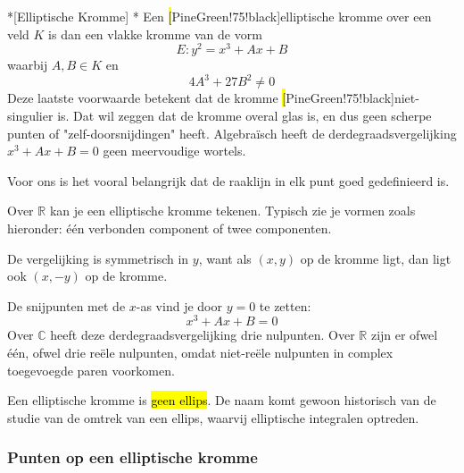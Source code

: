 \begin{nicedefinition}*[Elliptische Kromme]
    \nextpart[]*
    Een \hl[PineGreen!75!black]{elliptische kromme} over een veld $K$ is dan een vlakke kromme van de vorm
    \begin{equation*}
        E : y^2 = x^3 + Ax + B
    \end{equation*}
    waarbij $A, B \in K$ en
    \begin{equation*}
        4A^3 + 27B^2 \neq 0
    \end{equation*}
    Deze laatste voorwaarde betekent dat de kromme \hl[PineGreen!75!black]{niet-singulier} is. Dat wil zeggen dat de kromme overal glas is, en dus geen scherpe punten of "zelf-doorsnijdingen" heeft. Algebraïsch heeft de derdegraadsvergelijking $x^3 + Ax + B = 0$ geen meervoudige wortels.

    \vspace{0.20cm}

    Voor ons is het vooral belangrijk dat de raaklijn in elk punt goed gedefinieerd is.
\end{nicedefinition}

\newpage
{}

Over $\mathbb{R}$ kan je een elliptische kromme tekenen. Typisch zie je vormen zoals hieronder: één verbonden component of twee componenten.

\begin{center}
\resizebox{1.0\textwidth}{!}{%
    
}
\end{center}

De vergelijking is symmetrisch in $y$, want als $(x,y)$ op de kromme ligt, dan ligt ook $(x, -y)$ op de kromme.

De snijpunten met de $x$-as vind je door $y=0$ te zetten:
\begin{equation*}
    x^3 + Ax + B = 0
\end{equation*}
Over $\mathbb{C}$ heeft deze derdegraadsvergelijking drie nulpunten. Over $\mathbb{R}$ zijn er ofwel één, ofwel drie reële nulpunten, omdat niet-reële nulpunten in complex toegevoegde paren voorkomen.


Een elliptische kromme is \hl{geen ellips}. De naam komt gewoon historisch van de studie van de omtrek van een ellips, waarvij elliptische integralen optreden.

\subsubsection{Punten op een elliptische kromme}

